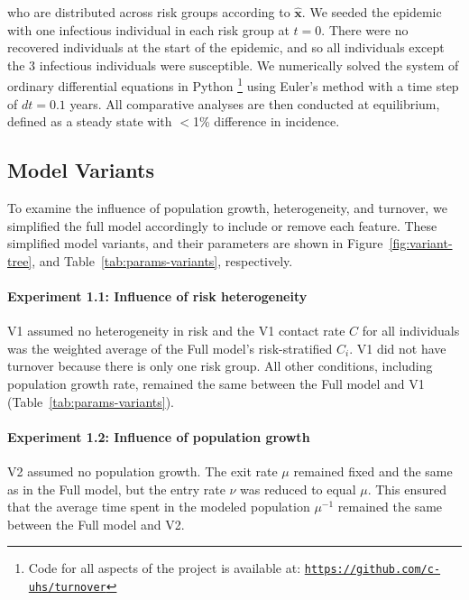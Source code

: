 who are distributed across risk groups according to $\bm{\hat{x}}$.
We seeded the epidemic with
one infectious individual in each risk group at $t = 0$.
There were no recovered individuals at the start of the epidemic,
and so all individuals except the 3 infectious individuals were susceptible.
We numerically solved the system of ordinary differential equations
in Python%
\footnote{Code for all aspects of the project is available at:
  \href{https://github.com/c-uhs/turnover}{\texttt{https://github.com/c-uhs/turnover}}}
using Euler's method with a time step of $dt = 0.1$ years.
All comparative analyses are then conducted at equilibrium,
defined as a steady state with $<$1\% difference in incidence.
\subsection{Model Variants}\label{ss:exp-variants}
To examine the influence of population growth, heterogeneity, and turnover,
we simplified the full model accordingly to include or remove each feature.
These simplified model variants, and their parameters are shown in
Figure~\ref{fig:variant-tree}, and
Table~\ref{tab:params-variants}, respectively.
\paragraph{Experiment 1.1: Influence of risk heterogeneity}
\label{p:exp-1-hetero}
V1 assumed no heterogeneity in risk and
the V1 contact rate $C$ for all individuals was the weighted
average of the Full model's risk-stratified $C_i$.
V1 did not have turnover because there is only one risk group.
All other conditions, including population growth rate, remained the same between
the Full model and V1 (Table~\ref{tab:params-variants}).
\paragraph{Experiment 1.2: Influence of population growth}
\label{p:exp-1-growth}
V2 assumed no population growth.
The exit rate $\mu$ remained fixed and the same as in the Full model,
but the entry rate $\nu$ was reduced to equal $\mu$.
This ensured that the average time spent in the modeled population $\mu^{-1}$
remained the same between the Full model and V2.
